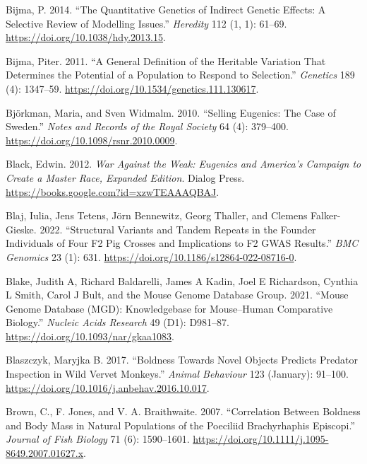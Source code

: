 \documentclass[
]{book}
\newlength{\cslhangindent}
\newlength{\cslentryspacingunit} %
\newenvironment{CSLReferences}[2] %
 {%
  \setlength{\parindent}{0pt}
  \ifodd #1
  \let\oldpar\par
  \def\par{\hangindent=\cslhangindent\oldpar}
  \fi
  \setlength{\parskip}{#2\cslentryspacingunit}
 }%
 {}
\begin{document}
\begin{CSLReferences}{1}{0}
\leavevmode{}%
Bijma, P. 2014. {``The Quantitative Genetics of Indirect Genetic Effects: A Selective Review of Modelling Issues.''} \emph{Heredity} 112 (1, 1): 61--69. \url{https://doi.org/10.1038/hdy.2013.15}.

\leavevmode{}%
Bijma, Piter. 2011. {``A {General Definition} of the {Heritable Variation That Determines} the {Potential} of a {Population} to {Respond} to {Selection}.''} \emph{Genetics} 189 (4): 1347--59. \url{https://doi.org/10.1534/genetics.111.130617}.

\leavevmode{}%
Björkman, Maria, and Sven Widmalm. 2010. {``Selling Eugenics: The Case of {Sweden}.''} \emph{Notes and Records of the Royal Society} 64 (4): 379--400. \url{https://doi.org/10.1098/rsnr.2010.0009}.

\leavevmode{}%
Black, Edwin. 2012. \emph{War {Against} the {Weak}: {Eugenics} and {America}'s {Campaign} to {Create} a {Master Race}, {Expanded Edition}}. {Dialog Press}. \url{https://books.google.com?id=xzwTEAAAQBAJ}.

\leavevmode{}%
Blaj, Iulia, Jens Tetens, Jörn Bennewitz, Georg Thaller, and Clemens Falker-Gieske. 2022. {``Structural Variants and Tandem Repeats in the Founder Individuals of Four {F2} Pig Crosses and Implications to {F2 GWAS} Results.''} \emph{BMC Genomics} 23 (1): 631. \url{https://doi.org/10.1186/s12864-022-08716-0}.

\leavevmode{}%
Blake, Judith A, Richard Baldarelli, James A Kadin, Joel E Richardson, Cynthia L Smith, Carol J Bult, and the Mouse Genome Database Group. 2021. {``Mouse {Genome Database} ({MGD}): {Knowledgebase} for Mouse--Human Comparative Biology.''} \emph{Nucleic Acids Research} 49 (D1): D981--87. \url{https://doi.org/10.1093/nar/gkaa1083}.

\leavevmode{}%
Blaszczyk, Maryjka B. 2017. {``Boldness Towards Novel Objects Predicts Predator Inspection in Wild Vervet Monkeys.''} \emph{Animal Behaviour} 123 (January): 91--100. \url{https://doi.org/10.1016/j.anbehav.2016.10.017}.

\leavevmode{}%
Brown, C., F. Jones, and V. A. Braithwaite. 2007. {``Correlation Between Boldness and Body Mass in Natural Populations of the Poeciliid {Brachyrhaphis} Episcopi.''} \emph{Journal of Fish Biology} 71 (6): 1590--1601. \url{https://doi.org/10.1111/j.1095-8649.2007.01627.x}.


\end{CSLReferences}
\end{document}
